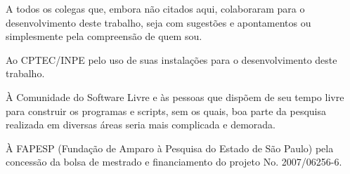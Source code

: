 \begin{agradecimentos}
A todos os colegas que, embora não citados aqui, colaboraram para o desenvolvimento deste trabalho, seja com sugestões e apontamentos ou simplesmente pela compreensão de quem sou.

Ao CPTEC/INPE pelo uso de suas instalações para o desenvolvimento deste trabalho.

À Comunidade do Software Livre e às pessoas que dispõem de seu tempo livre para construir os programas e scripts, sem os quais, boa parte da pesquisa realizada em diversas áreas seria mais complicada e demorada. 

À FAPESP (Fundação de Amparo à Pesquisa do Estado de São Paulo) pela concessão da bolsa de mestrado e financiamento do projeto No. 2007/06256-6.

\end{agradecimentos}
